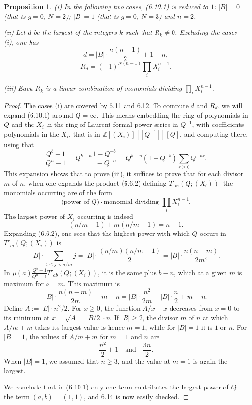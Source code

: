 \documentclass[11pt,a4paper]{article}
\theoremstyle{plain}
\newtheorem{proposition}[theorem]{Proposition}
\theoremstyle{definition}
\newcommand{\Z}{\mathbb{Z}}
\begin{document}
\begin{proposition}
\emph{(i)} In the following two cases, (6.10.1) is reduced to $1$: $|B| = 0$ (that is $g = 0$, $N = 2$); $|B| = 1$ (that is $g = 0$, $N = 3$) and $n = 2$.

\emph{(ii)} Let $d$ be the largest of the integers $k$ such that $R_k \neq 0$. Excluding the cases (i), one has
\begin{equation}
d = |B| \cdot \frac{n(n-1)}{2} + 1 - n, \tag{6.14.1}
\end{equation}
\begin{equation}
R_d = (-1)^{N(n-1)} \prod_i X_i^{n-1}. \tag{6.14.2}
\end{equation}

\emph{(iii)} Each $R_k$ is a linear combination of monomials dividing $\prod_i X_i^{n-1}$.
\end{proposition}

\begin{proof}
The cases (i) are covered by 6.11 and 6.12. To compute $d$ and $R_d$, we will expand (6.10.1) around $Q = \infty$. This means embedding the ring of polynomials in $Q$ and the $X_i$ in the ring of Laurent formal power series in $Q^{-1}$, with coefficients polynomials in the $X_i$, that is in $\Z[(X_i)][[Q^{-1}]][Q]$, and computing there, using that
\begin{equation}
\frac{Q^b - 1}{Q^n - 1} = Q^{b-n} \frac{1 - Q^{-b}}{1 - Q^{-n}} = Q^{b-n} (1 - Q^{-b}) \sum_{r \geq 0} Q^{-nr}. \tag{6.14.3}
\end{equation}
This expansion shows that to prove (iii), it suffices to prove that for each divisor $m$ of $n$, when one expands the product (6.6.2) defining $T'_m(Q; (X_i))$, the monomials occurring are of the form
\[
\text{(power of $Q$)} \cdot \text{monomial dividing $\prod_i X_i^{n-1}$}.
\]
The largest power of $X_i$ occurring is indeed
\[
(n/m - 1) + m(n/m - 1) = n - 1.
\]
Expanding (6.6.2), one sees that the highest power with which $Q$ occurs in $T'_m(Q; (X_i))$ is
\[
|B| \cdot \sum_{1 \leq j < n/m} j = |B| \cdot \frac{(n/m)(n/m - 1)}{2} = |B| \cdot \frac{n(n-m)}{2m^2}.
\]
In $\mu(a) \frac{Q^b - 1}{Q^n - 1} T'_{ab}(Q; (X_i))$, it is the same plus $b - n$, which at a given $m$ is maximum for $b = m$. This maximum is
\begin{equation}
|B| \cdot \frac{n(n-m)}{2m} + m - n = |B| \cdot \frac{n^2}{2m} - |B| \cdot \frac{n}{2} + m - n. \tag{6.14.4}
\end{equation}
Define $A := |B| \cdot n^2/2$. For $x \geq 0$, the function $A/x + x$ decreases from $x = 0$ to its minimum at $x = \sqrt{A} = |B/2| \cdot n$. If $|B| \geq 2$, the divisor $m$ of $n$ at which $A/m + m$ takes its largest value is hence $m = 1$, while for $|B| = 1$ it is $1$ or $n$. For $|B| = 1$, the values of $A/m + m$ for $m = 1$ and $n$ are
\[
\frac{n^2}{2} + 1 \quad \text{and} \quad \frac{3n}{2}.
\]
When $|B| = 1$, we assumed that $n \geq 3$, and the value at $m = 1$ is again the largest.

We conclude that in (6.10.1) only one term contributes the largest power of $Q$: the term $(a,b) = (1,1)$, and 6.14 is now easily checked.
\end{proof}
\end{document}
